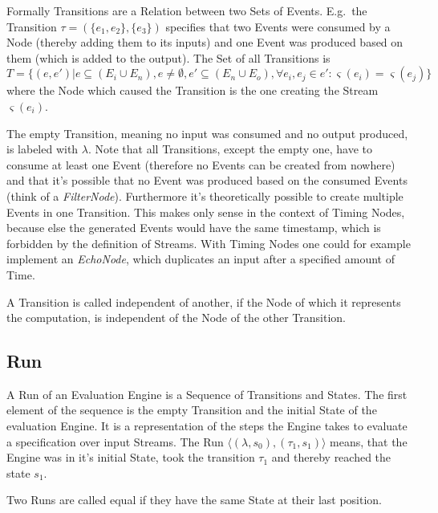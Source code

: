 Formally Transitions are a Relation between two Sets of Events.
E.g.\ the Transition \(\tau = (\{e_1,e_2\}, \{e_3\})\) specifies that two Events were consumed by a Node (thereby adding them to its inputs) and one Event was produced based on them (which is added to the output).
The Set of all Transitions is
\[
  T = \{(e, e') | e \subseteq (E_i \cup E_n),e \neq \emptyset, e' \subseteq (E_n \cup E_o), \forall e_i, e_j \in e': \varsigma(e_i) = \varsigma(e_j)\}
\]
where the Node which caused the Transition is the one creating the Stream \(\varsigma(e_i)\).

The empty Transition, meaning no input was consumed and no output produced, is labeled with \(\lambda\).
Note that all Transitions, except the empty one, have to consume at least one Event (therefore no Events can be created from nowhere) and that it's possible that no Event was produced based on the consumed Events (think of a \emph{FilterNode}).
Furthermore it's theoretically possible to create multiple Events in one Transition.
This makes only sense in the context of Timing Nodes, because else the generated Events would have the same timestamp, which is forbidden by the definition of Streams.
With Timing Nodes one could for example implement an \emph{EchoNode}, which duplicates an input after a specified amount of Time.

\begin{definition}[name = Independence of Transitions]\label{def:independence_transitions}
  A Transition is called independent of another, if the Node of which it represents the computation, is independent of the Node of the other Transition.
\end{definition}


\subsection{Run}
\label{sec:concepts:def:run}

A Run of an Evaluation Engine is a Sequence of Transitions and States.
The first element of the sequence is the empty Transition and the initial State of the evaluation Engine.
It is a representation of the steps the Engine takes to evaluate a specification over input Streams.
The Run \(\langle (\lambda, s_0), (\tau_1, s_1) \rangle\) means, that the Engine was in it's initial State, took the transition \(\tau_1\) and thereby reached the state \(s_1\).

\begin{definition}[name = Equality of Runs]\label{def:equal_runs}
  Two Runs are called equal if they have the same State at their last position.
\end{definition}

